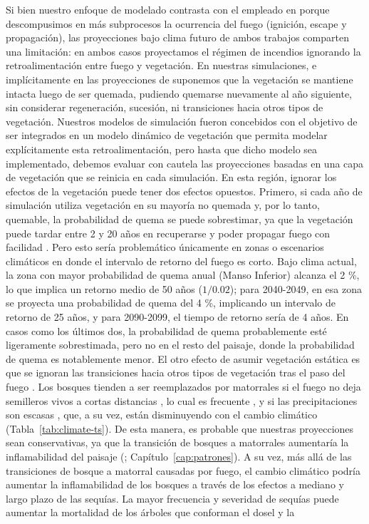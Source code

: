 Si bien nuestro enfoque de modelado contrasta con el empleado en \citet{kitzberger_projections_2022} porque descompusimos en más subprocesos la ocurrencia del fuego (ignición, escape y propagación), las proyecciones bajo clima futuro de ambos trabajos comparten una limitación: en ambos casos proyectamos el régimen de incendios ignorando la retroalimentación entre fuego y vegetación. En nuestras simulaciones, e implícitamente en las proyecciones de \citet{kitzberger_projections_2022} suponemos que la vegetación se mantiene intacta luego de ser quemada, pudiendo quemarse nuevamente al año siguiente, sin considerar regeneración, sucesión, ni transiciones hacia otros tipos de vegetación. Nuestros modelos de simulación fueron concebidos con el objetivo de ser integrados en un modelo dinámico de vegetación que permita modelar explícitamente esta retroalimentación, pero hasta que dicho modelo sea implementado, debemos evaluar con cautela las proyecciones basadas en una capa de vegetación que se reinicia en cada simulación. En esta región, ignorar los efectos de la vegetación puede tener dos efectos opuestos. Primero, si cada año de simulación utiliza vegetación en su mayoría no quemada y, por lo tanto, quemable, la probabilidad de quema se puede sobrestimar, ya que la vegetación puede tardar entre 2 y 20 años en recuperarse y poder propagar fuego con facilidad \citep{tiribelli_changes_2018, tiribelli_non-additive_2019}. Pero esto sería problemático únicamente en zonas o escenarios climáticos en donde el intervalo de retorno del fuego es corto. Bajo clima actual, la zona con mayor probabilidad de quema anual (Manso Inferior) alcanza el 2 \%, lo que implica un retorno medio de 50 años ($1/0.02$); para 2040-2049, en esa zona se proyecta una probabilidad de quema del 4 \%, implicando un intervalo de retorno de 25 años, y para 2090-2099, el tiempo de retorno sería de 4 años. En casos como los últimos dos, la probabilidad de quema probablemente esté ligeramente sobrestimada, pero no en el resto del paisaje, donde la probabilidad de quema es notablemente menor. El otro efecto de asumir vegetación estática es que se ignoran las transiciones hacia otros tipos de vegetación tras el paso del fuego \citep{kitzberger_firevegetation_2016}. Los bosques tienden a ser reemplazados por matorrales si el fuego no deja semilleros vivos a cortas distancias \citep{landesmann_importance_2018,landesmann_increased_2021}, lo cual es frecuente \citep{tiribelli2024spatial}, y si las precipitaciones son escasas \citep{cuevas_tree_2000,kitzberger_effects_2005,tercero-bucardo_field_2007}, que, a su vez, están disminuyendo con el cambio climático (Tabla~\ref{tab:climate-ts}). De esta manera, es probable que nuestras proyecciones sean conservativas, ya que la transición de bosques a matorrales aumentaría la inflamabilidad del paisaje (\citealt{mermoz_landscape_2005,paritsis_positive_2015,morales_stochastic_2015,tiribelli_changes_2018,tiribelli_non-additive_2019}; Capítulo~\ref{cap:patrones}). A su vez, más allá de las transiciones de bosque a matorral causadas por fuego, el cambio climático podría aumentar la inflamabilidad de los bosques a través de los efectos a mediano y largo plazo de las sequías. La mayor frecuencia y severidad de sequías puede aumentar la mortalidad de los árboles que conforman el dosel y la 